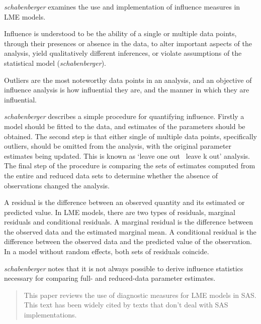 \documentclass[main.tex]{subfiles}
\begin{document}
	
	
	\textit{schabenberger} examines the use and implementation of
	influence measures in LME models.
	
	Influence is understood to be the ability of a single or multiple
	data points, through their presences or absence in the data, to
	alter important aspects of the analysis, yield qualitatively
	different inferences, or violate assumptions of the statistical
	model (\textit{schabenberger}).
	
	Outliers are the most noteworthy data points in an analysis, and
	an objective of influence analysis is how influential they are,
	and the manner in which they are influential.
	
	\textit{schabenberger} describes a simple procedure for quantifying
	influence. Firstly a model should be fitted to the data, and
	estimates of the parameters should be obtained. The second step is
	that either single of multiple data points, specifically outliers,
	should be omitted from the analysis, with the original parameter
	estimates being updated. This is known as `leave one out \ leave k
	out' analysis. The final step of the procedure is comparing the
	sets of estimates computed from the entire and reduced data sets
	to determine whether the absence of observations changed the
	analysis.
	
	
	
	A residual is the difference between an observed quantity and its
	estimated or predicted value. In LME models, there are two types
	of residuals, marginal residuals and conditional residuals. A
	marginal residual is the difference between the observed data and
	the estimated marginal mean. A conditional residual is the
	difference between the observed data and the predicted value of
	the observation. In a model without random effects, both sets of
	residuals coincide.
	
	\textit{schabenberger} notes that it is not always possible to
	derive influence statistics necessary for comparing full- and
	reduced-data parameter estimates. 
	
	
	\begin{abstract}
		\noindent This paper reviews the use of diagnostic measures for LME models in SAS. This text has been widely cited by texts that don't deal with SAS implementations.
	\end{abstract}
	
\end{document}
